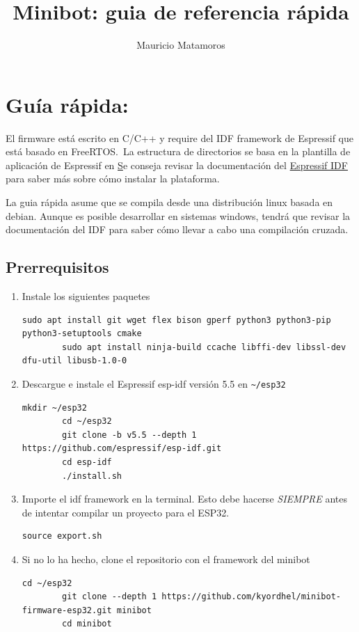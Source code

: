 \documentclass[letterpaper,10.5pt]{article}
\title{Minibot: guia de referencia rápida}
\author{Mauricio Matamoros}
\begin{document}
\maketitle{}

\section{Guía rápida:}
El firmware está escrito en C/C++ y require del IDF framework de Espressif que está basado en FreeRTOS.\,
La estructura de directorios se basa en la plantilla de aplicación de Espressif en \href{https://github.com/espressif/esp-idf}
Se conseja revisar la documentación del \href{https://docs.espressif.com/projects/esp-idf/en/latest/get-started/index.html}{Espressif IDF} para saber más sobre cómo instalar la plataforma.

La guia rápida asume que se compila desde una distribución linux basada en debian. Aunque es posible desarrollar en sistemas windows, tendrá que revisar la documentación del IDF para saber cómo llevar a cabo una compilación cruzada.

\subsection{Prerrequisitos}
\begin{enumerate}
	\item Instale los siguientes paquetes
	\begin{Verbatim}[gobble=2]
		sudo apt install git wget flex bison gperf python3 python3-pip python3-setuptools cmake
		sudo apt install ninja-build ccache libffi-dev libssl-dev dfu-util libusb-1.0-0
	\end{Verbatim}
	\item Descargue e instale el Espressif esp-idf versión 5.5 en \texttt{\textasciitilde/esp32}
	\begin{Verbatim}[gobble=2]
		mkdir ~/esp32
		cd ~/esp32
		git clone -b v5.5 --depth 1 https://github.com/espressif/esp-idf.git
		cd esp-idf
		./install.sh
	\end{Verbatim}

	\item Importe el idf framework en la terminal. Esto debe hacerse \emph{SIEMPRE} antes de intentar compilar un proyecto para el ESP32.
	\begin{Verbatim}[gobble=2]
		source export.sh
	\end{Verbatim}

	\item Si no lo ha hecho, clone el repositorio con el framework del minibot
	\begin{Verbatim}[gobble=2]
		cd ~/esp32
		git clone --depth 1 https://github.com/kyordhel/minibot-firmware-esp32.git minibot
		cd minibot
	\end{Verbatim}

\end{enumerate}
\end{document}
